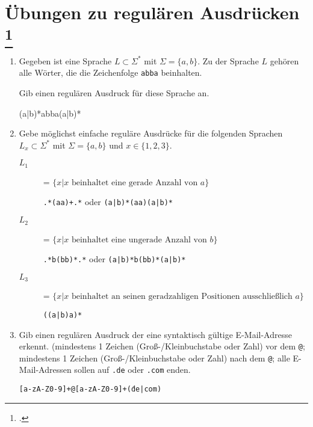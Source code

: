 \documentclass{lehramt-informatik-aufgabe}
\begin{document}
\section{Übungen zu regulären Ausdrücken
\footcite[Seite 21]{theo:fs:1}}

\begin{enumerate}

%

\item Gegeben ist eine Sprache $L \subset \Sigma^*$ mit $\Sigma =
\{a,b\}$. Zu der Sprache $L$ gehören alle Wörter, die die Zeichenfolge
\texttt{abba} beinhalten.

Gib einen regulären Ausdruck für diese Sprache an.

\begin{liAntwort}
(a|b)*abba(a|b)*
\end{liAntwort}

%

\item Gebe möglichst einfache reguläre Ausdrücke für die folgenden
Sprachen $L_x \subset \Sigma^*$ mit $\Sigma = \{a,b\}$ und $x \in \{1, 2, 3\}$.

\begin{description}
\item[$L_1$] = $\{ x | x \text{ beinhaltet eine gerade Anzahl von } a \}$

\begin{liAntwort}
\texttt{.*(aa)+.*} oder \texttt{(a|b)*(aa)(a|b)*}
\end{liAntwort}

\item[$L_2$] = $\{ x | x \text{ beinhaltet eine ungerade Anzahl von } b \}$

\begin{liAntwort}
\texttt{.*b(bb)*.*} oder \texttt{(a|b)*b(bb)*(a|b)*}
\end{liAntwort}

\item[$L_3$] = $\{ x | x \text{ beinhaltet an seinen geradzahligen Positionen ausschließlich } a \}$

\begin{liAntwort}
\texttt{((a|b)a)*}
\end{liAntwort}
\end{description}

%

\item Gib einen regulären Ausdruck der eine syntaktisch gültige
E-Mail-Adresse erkennt. (mindestens 1 Zeichen (Groß-/Kleinbuchstabe oder
Zahl) vor dem \texttt{@}; mindestens 1 Zeichen (Groß-/Kleinbuchstabe
oder Zahl) nach dem \texttt{@}; alle E-Mail-Adressen sollen auf
\texttt{.de} oder \texttt{.com} enden.

\begin{liAntwort}
\texttt{[a-zA-Z0-9]+@[a-zA-Z0-9]+\.(de|com)}
\end{liAntwort}
\end{enumerate}

\begin{liAntwort}
\end{liAntwort}
\end{document}
